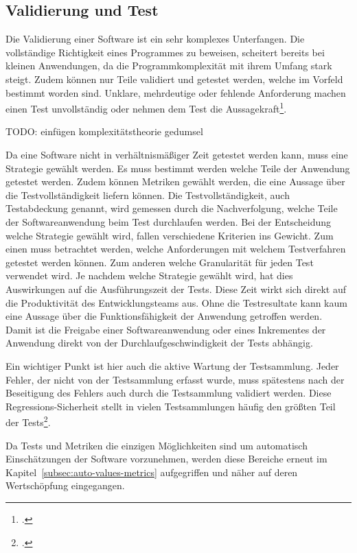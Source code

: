 \subsection{Validierung und Test}

Die Validierung einer Software ist ein sehr komplexes Unterfangen. Die vollständige Richtigkeit eines Programmes 
zu beweisen, scheitert bereits bei kleinen Anwendungen, da die Programmkomplexität mit ihrem Umfang stark steigt. Zudem 
können nur Teile validiert und getestet werden, welche im Vorfeld bestimmt worden sind. Unklare, mehrdeutige oder 
fehlende Anforderung machen einen Test unvollständig oder nehmen dem Test die Aussagekraft\footcite[S. 243 Kapitel 4.6][]{software-quality2008}.

TODO: einfügen komplexitätstheorie gedumsel

Da eine Software nicht in verhältnismäßiger Zeit getestet werden kann, muss eine Strategie gewählt werden. Es muss 
bestimmt werden welche Teile der Anwendung getestet werden. Zudem können Metriken gewählt werden, die eine Aussage über 
die Testvollständigkeit liefern können. Die Testvollständigkeit, auch Testabdeckung genannt, wird gemessen durch die 
Nachverfolgung, welche Teile der Softwareanwendung beim Test durchlaufen werden. Bei der Entscheidung welche Strategie gewählt wird, fallen verschiedene Kriterien ins Gewicht. Zum einen muss betrachtet werden, welche Anforderungen mit welchem Testverfahren getestet werden können. Zum anderen welche Granularität für jeden Test verwendet wird.
Je nachdem welche Strategie gewählt wird, hat dies Auswirkungen auf die Ausführungszeit der Tests. Diese Zeit wirkt sich 
direkt auf die Produktivität des Entwicklungsteams aus. Ohne die Testresultate kann kaum eine Aussage über die 
Funktionsfähigkeit der Anwendung getroffen werden. Damit ist die Freigabe einer Softwareanwendung oder eines Inkrementes 
der Anwendung direkt von der Durchlaufgeschwindigkeit der Tests abhängig.

Ein wichtiger Punkt ist hier auch die aktive Wartung der Testsammlung. Jeder Fehler, der nicht von der Testsammlung 
erfasst wurde, muss spätestens nach der Beseitigung des Fehlers auch durch die Testsammlung validiert werden. Diese 
Regressions-Sicherheit stellt in vielen Testsammlungen häufig den größten Teil der Tests\footcite{software-quality2008}.

Da Tests und Metriken die einzigen Möglichkeiten sind um automatisch Einschätzungen der Software vorzunehmen, werden 
diese Bereiche erneut im Kapitel~\ref{subsec:auto-values-metrics} aufgegriffen und näher auf deren Wertschöpfung 
eingegangen.


